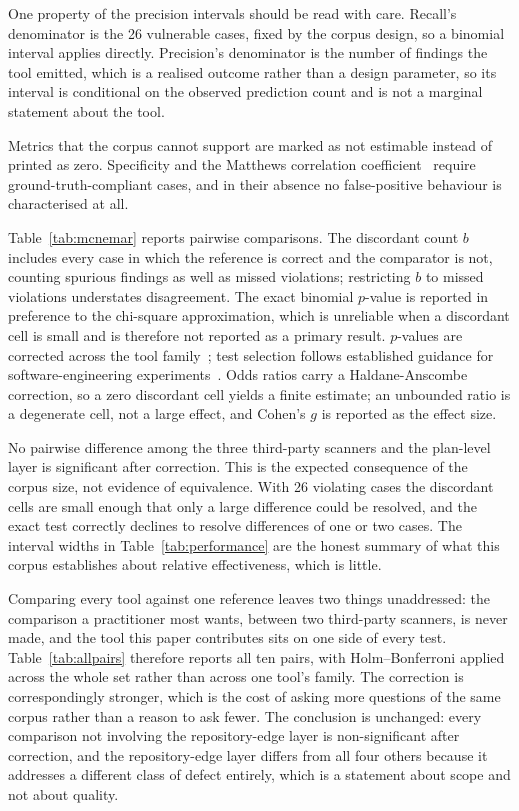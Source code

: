 \documentclass[journal]{IEEEtran}
\newcommand{\resulttable}[1]{%
  \IfFileExists{../results/tables/#1.tex}%
    {}%
    {\begin{table}[!t]\centering\small
       \fbox{\parbox{0.9\columnwidth}{\centering
         \texttt{\detokenize{results/tables/#1.tex}} not found.\\[2pt]
         Run \texttt{experiments/run\_baselines.sh} to generate it.}}%
     \end{table}}}
\renewcommand{\resulttable}[1]{}
\begin{document}
One property of the precision intervals should be read with care. Recall's
denominator is the 26 vulnerable cases, fixed by the corpus design, so a binomial
interval applies directly. Precision's denominator is the number of findings the
tool emitted, which is a realised outcome rather than a design parameter, so its
interval is conditional on the observed prediction count and is not a marginal
statement about the tool.

Metrics that the corpus cannot support are marked as
not estimable instead of printed as zero. Specificity and the Matthews
correlation coefficient~\cite{matthews1975comparison} require ground-truth-compliant cases, and in their
absence no false-positive behaviour is characterised at all.

\resulttable{mcnemar}

Table~\ref{tab:mcnemar} reports pairwise comparisons. The discordant count $b$
includes every case in which the reference is correct and the comparator is not,
counting spurious findings as well as missed violations; restricting $b$ to
missed violations understates disagreement. The exact binomial $p$-value is
reported in preference to the chi-square approximation, which is unreliable when a
discordant cell is small and is therefore not reported as a primary result.
$p$-values are corrected across the tool family~\cite{holm1979simple}; test selection follows established guidance for software-engineering experiments~\cite{arcuri2014hitchhiker}. Odds
ratios carry a Haldane-Anscombe correction, so a zero discordant cell yields a
finite estimate; an unbounded ratio is a degenerate cell, not a large
effect, and Cohen's $g$ is reported as the effect size.

No pairwise difference among the three third-party scanners and the plan-level layer
is significant after correction. This is the expected consequence of the corpus size,
not evidence of equivalence. With 26 violating cases the discordant cells
are small enough that only a large difference could be resolved, and the exact test
correctly declines to resolve differences of one or two cases. The interval widths
in Table~\ref{tab:performance} are the honest summary of what this corpus
establishes about relative effectiveness, which is little.

\resulttable{allpairs}

Comparing every tool against one reference leaves two things unaddressed: the
comparison a practitioner most wants, between two third-party scanners, is never
made, and the tool this paper contributes sits on one side of every test.
Table~\ref{tab:allpairs} therefore reports all ten pairs, with Holm--Bonferroni
applied across the whole set rather than across one tool's family. The correction
is correspondingly stronger, which is the cost of asking more questions of the same
corpus rather than a reason to ask fewer. The conclusion is unchanged: every
comparison not involving the repository-edge layer is non-significant after
correction, and the repository-edge layer differs from all four others because it
addresses a different class of defect entirely, which is a statement about scope
and not about quality.
\end{document}
